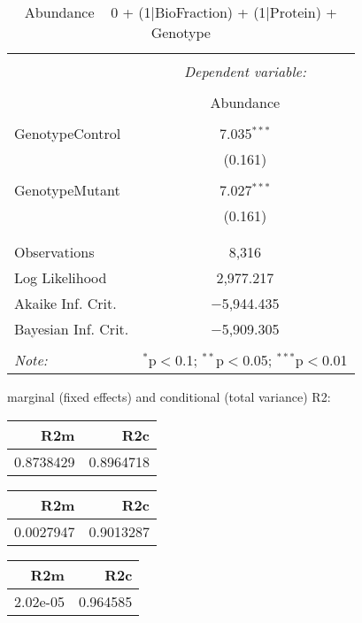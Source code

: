 \documentclass[11pt]{report}
\begin{document}
\begin{table}[!htbp] \centering 
  \caption{Abundance ~ 0 + (1|BioFraction) + (1|Protein) + Genotype} 
  \label{} 
\begin{tabular}{@{\extracolsep{5pt}}lc} 
\\[-1.8ex]\hline 
\hline \\[-1.8ex] 
 & \multicolumn{1}{c}{\textit{Dependent variable:}} \\ 
\cline{2-2} 
\\[-1.8ex] & Abundance \\ 
\hline \\[-1.8ex] 
 GenotypeControl & 7.035$^{***}$ \\ 
  & (0.161) \\ 
  & \\ 
 GenotypeMutant & 7.027$^{***}$ \\ 
  & (0.161) \\ 
  & \\ 
\hline \\[-1.8ex] 
Observations & 8,316 \\ 
Log Likelihood & 2,977.217 \\ 
Akaike Inf. Crit. & $-$5,944.435 \\ 
Bayesian Inf. Crit. & $-$5,909.305 \\ 
\hline 
\hline \\[-1.8ex] 
\textit{Note:}  & \multicolumn{1}{r}{$^{*}$p$<$0.1; $^{**}$p$<$0.05; $^{***}$p$<$0.01} \\ 
\end{tabular} 
\end{table} 
marginal (fixed effects) and conditional (total variance) R2:

\begin{tabular}{r|r}
\hline
R2m & R2c\\
\hline
0.8738429 & 0.8964718\\
\hline
\end{tabular}

\begin{tabular}{r|r}
\hline
R2m & R2c\\
\hline
0.0027947 & 0.9013287\\
\hline
\end{tabular}

\begin{tabular}{r|r}
\hline
R2m & R2c\\
\hline
2.02e-05 & 0.964585\\
\hline
\end{tabular}
\end{document}
